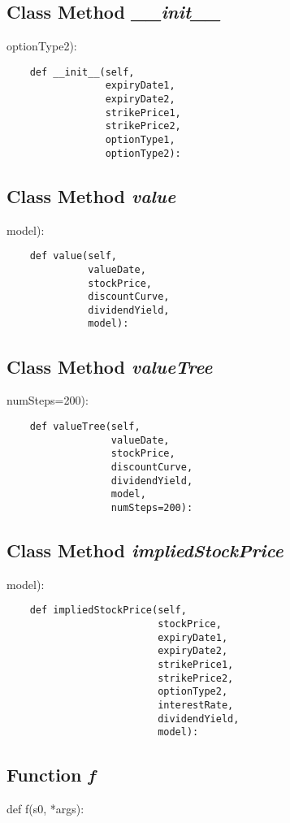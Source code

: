 \documentclass[twoside,11pt]{book}
\begin{document}
\subsection{Class Method {\it \_\_init\_\_}}
optionType2):

\begin{lstlisting}
    def __init__(self,
                 expiryDate1,
                 expiryDate2,
                 strikePrice1,
                 strikePrice2,
                 optionType1,
                 optionType2):
\end{lstlisting}

\subsection{Class Method {\it value}}
model):

\begin{lstlisting}
    def value(self,
              valueDate,
              stockPrice,
              discountCurve,
              dividendYield,
              model):
\end{lstlisting}

\subsection{Class Method {\it valueTree}}
numSteps=200):

\begin{lstlisting}
    def valueTree(self,
                  valueDate,
                  stockPrice,
                  discountCurve,
                  dividendYield,
                  model,
                  numSteps=200):
\end{lstlisting}

\subsection{Class Method {\it impliedStockPrice}}
model):

\begin{lstlisting}
    def impliedStockPrice(self,
                          stockPrice,
                          expiryDate1,
                          expiryDate2,
                          strikePrice1,
                          strikePrice2,
                          optionType2,
                          interestRate,
                          dividendYield,
                          model):
\end{lstlisting}

\subsection{Function {\it f}}
def f(s0, *args):
\end{document}
